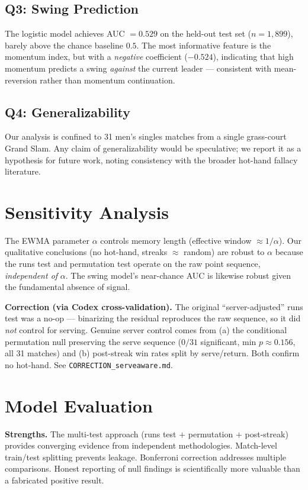 \documentclass[11pt,a4paper]{article}
\begin{document}
\subsection{Q3: Swing Prediction}
The logistic model achieves AUC $= 0.529$ on the held-out test set ($n = 1{,}899$), barely above the chance baseline $0.5$. The most informative feature is the momentum index, but with a \emph{negative} coefficient ($-0.524$), indicating that high momentum predicts a swing \emph{against} the current leader --- consistent with mean-reversion rather than momentum continuation.

\subsection{Q4: Generalizability}
Our analysis is confined to 31 men's singles matches from a single grass-court Grand Slam. Any claim of generalizability would be speculative; we report it as a hypothesis for future work, noting consistency with the broader hot-hand fallacy literature.

\section{Sensitivity Analysis}
The EWMA parameter $\alpha$ controls memory length (effective window $\approx 1/\alpha$). Our qualitative conclusions (no hot-hand, streaks $\approx$ random) are robust to $\alpha$ because the runs test and permutation test operate on the raw point sequence, \emph{independent of} $\alpha$. The swing model's near-chance AUC is likewise robust given the fundamental absence of signal.

\medskip
\noindent\textbf{Correction (via Codex cross-validation).} The original ``server-adjusted'' runs test was a no-op --- binarizing the residual reproduces the raw sequence, so it did \emph{not} control for serving. Genuine server control comes from (a) the conditional permutation null preserving the serve sequence ($0/31$ significant, min $p \approx 0.156$, all 31 matches) and (b) post-streak win rates split by serve/return. Both confirm no hot-hand. See \texttt{CORRECTION\_serveaware.md}.

\section{Model Evaluation}
\textbf{Strengths.} The multi-test approach (runs test $+$ permutation $+$ post-streak) provides converging evidence from independent methodologies. Match-level train/test splitting prevents leakage. Bonferroni correction addresses multiple comparisons. Honest reporting of null findings is scientifically more valuable than a fabricated positive result.
\end{document}
